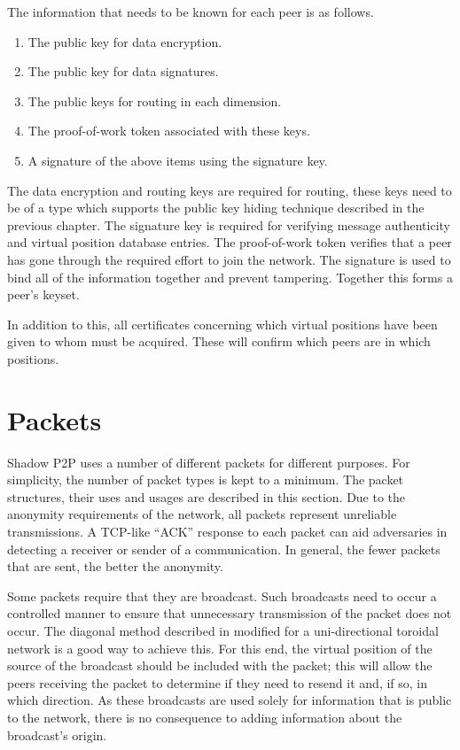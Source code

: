 \documentclass[ %
                    author={Luke Murray},
                supervisor={Dr. Simon Hollis},
                     title={Shadow Peer-to-Peer Networks},
                  subtitle={},
                    degree={MEng},
                      year={2013} ]{thesis}
\begin{document}
The information that needs to be known for each peer is as follows.
\begin{enumerate}
\item The public key for data encryption.
\item The public key for data signatures.
\item The public keys for routing in each dimension.
\item The proof-of-work token associated with these keys.
\item A signature of the above items using the signature key.
\end{enumerate}
The data encryption and routing keys are required for routing, these keys need to be of a type which supports the public key hiding technique described in the previous chapter. The signature key is required for verifying message authenticity and virtual position database entries. The proof-of-work token verifies that a peer has gone through the required effort to join the network. The signature is used to bind all of the information together and prevent tampering. Together this forms a peer's keyset.

In addition to this, all certificates concerning which virtual positions have been given to whom must be acquired. These will confirm which peers are in which positions.

\section{Packets}

Shadow P2P uses a number of different packets for different purposes. For simplicity, the number of packet types is kept to a minimum. The packet structures, their uses and usages are described in this section. Due to the anonymity requirements of the network, all packets represent unreliable transmissions. A TCP-like ``ACK'' response to each packet can aid adversaries in detecting a receiver or sender of a communication. In general, the fewer packets that are sent, the better the anonymity.

Some packets require that they are broadcast. Such broadcasts need to occur a controlled manner to ensure that unnecessary transmission of the packet does not occur. The diagonal method described in \cite{218454} modified for a uni-directional toroidal network is a good way to achieve this. For this end, the virtual position of the source of the broadcast should be included with the packet; this will allow the peers receiving the packet to determine if they need to resend it and, if so, in which direction. As these broadcasts are used solely for information that is public to the network, there is no consequence to adding information about the broadcast's origin. 
\end{document}
